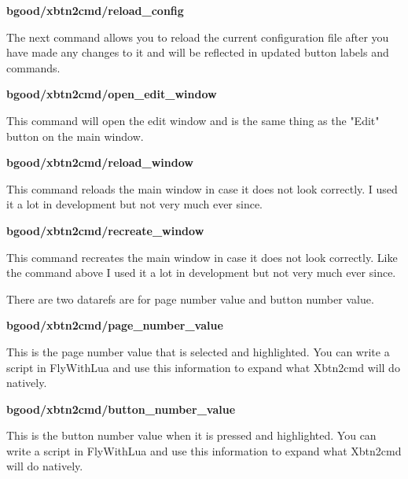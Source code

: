 \documentclass[11pt,parskip=half,a4paper]{scrartcl}
\begin{document}
{\bf bgood/xbtn2cmd/reload\_config}

The next command allows you to reload the current configuration file after you have made any changes to it and will be reflected in updated button labels and commands.


{\bf bgood/xbtn2cmd/open\_edit\_window}

This command will open the edit window and is the same thing as the "Edit" button on the main window.


{\bf bgood/xbtn2cmd/reload\_window}

This command reloads the main window in case it does not look correctly. I used it a lot in development but not very much ever since.


{\bf bgood/xbtn2cmd/recreate\_window}

This command recreates the main window in case it does not look correctly. Like the command above I used it a lot in development but not very much ever since. \newline \newline 


There are two datarefs are for page number value and button number value.

{\bf bgood/xbtn2cmd/page\_number\_value}

This is the page number value that is selected and highlighted. You can write a script in FlyWithLua and use this information to expand what Xbtn2cmd will do natively. 


{\bf bgood/xbtn2cmd/button\_number\_value}

This is the button number value when it is pressed and highlighted. You can write a script in FlyWithLua and use this information to expand what Xbtn2cmd will do natively.
\end{document}
